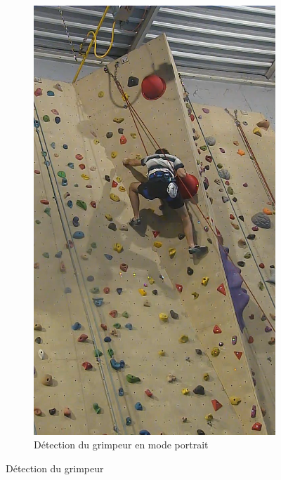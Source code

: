 \documentclass[a4paper, 11pt, french]{article}
\begin{document}
\begin{figure}[!ht]
\begin{center}
\begin{subfigure}[t]{0.22\textwidth}
            \includegraphics[width=\textwidth]{exemplePortrait.png}
            \caption{Détection du grimpeur en mode portrait}
            \label{fig:test2}
        \end{subfigure}
        \caption{Détection du grimpeur}
        \label{fig:testDetection}
     \end{center}
\end{figure}
\end{document}
